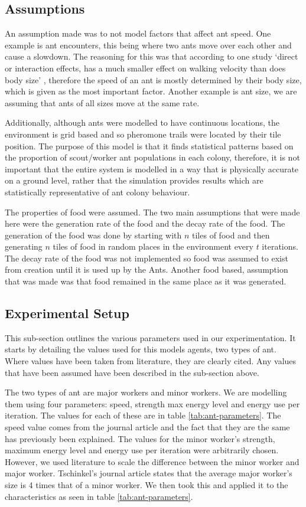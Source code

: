  \subsection{Assumptions}
An assumption made was to not model factors that affect ant speed. One example is ant encounters, this being where two ants move over each other and cause a slowdown. The reasoning for this was that according to one study `direct or interaction effects, has a much smaller effect on walking velocity than does body size' \cite{Burd2003}, therefore the speed of an ant is mostly determined by their body size, which is given as the most important factor. Another example is ant size, we are assuming that ants of all sizes move at the same rate.\par
Additionally, although ants were modelled to have continuous locations, the environment is grid based and so pheromone trails were located by their tile position. The purpose of this model is that it finds statistical patterns based on the proportion of scout/worker ant populations in each colony, therefore, it is not important that the entire system is modelled in a way that is physically accurate on a ground level, rather that the simulation provides results which are statistically representative of ant colony behaviour.\par 
The properties of food were assumed. The two main assumptions that were made here were the generation rate of the food and the decay rate of the food. The generation of the food was done by starting with $n$ tiles of food and then generating $n$ tiles of food in random places in the environment every $t$ iterations. The decay rate of the food was not implemented so food was assumed to exist from creation until it is used up by the Ants. Another food based, assumption that was made was that food remained in the same place as it was generated.\par
 
 \subsection{Experimental Setup}
 This sub-section outlines the various parameters used in our experimentation. It starts by detailing the values used for this models agents, two types of ant. Where values have been taken from literature, they are clearly cited. Any values that have been assumed have been described in the sub-section above.\par
The two types of ant are major workers and minor workers. We are modelling them using four parameters: speed, strength max energy level and energy use per iteration. The values for each of these are in table \ref{tab:ant-parameters}. The speed value comes from the journal article \cite{Burd2003} and the fact that they are the same has previously been explained. The values for the minor worker's strength, maximum energy level and energy use per iteration were arbitrarily chosen. However, we used literature to scale the difference between the minor worker and major worker. Tschinkel's journal article \cite{Tschinkel1988} states that the average major worker's size is 4 times that of a minor worker. We then took this and applied it to the characteristics as seen in table \ref{tab:ant-parameters}.

